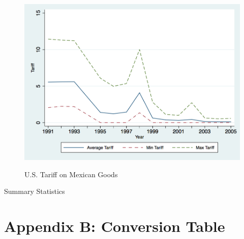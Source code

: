 \documentclass[a4paper,12pt]{article}
\begin{document}
{\begin{figure}[htpb]\centering
\caption{\small U.S. Tariff on Mexican Goods}\vspace{0.2cm}
\includegraphics[scale=0.35]{usa_mex_tariff}
\label{fig:usa_mex}
\end{figure}


\begin{center}
\begin{table}

\caption{Summary Statistics}
\label{tab:sumstats}
\end{table}
\end{center}


\section{Appendix B: Conversion Table}

}
\end{document}
